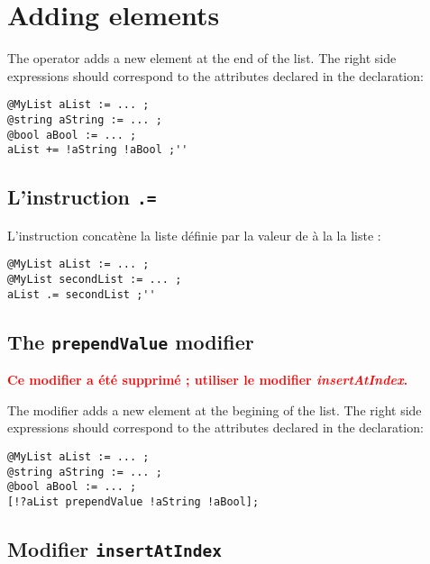 \section{Adding elements}


The  \galgas{+=} operator adds a new element at the end of the list. The right side expressions should correspond to the attributes declared in the  declaration:\\

\begin{lstlisting}[language=galgas]
@MyList aList := ... ;
@string aString := ... ;
@bool aBool := ... ;
aList += !aString !aBool ;''
\end{lstlisting}


\subsection{L'instruction \texttt{.=}}

L'instruction  concatène la liste définie par la valeur de  à la la liste  :

\begin{lstlisting}[language=galgas]
@MyList aList := ... ;
@MyList secondList := ... ;
aList .= secondList ;''
\end{lstlisting}



\subsection{The \texttt{prependValue} modifier}

{\bf \textcolor{red}{Ce modifier a été supprimé ; utiliser le modifier \emph{insertAtIndex}.}}

The  modifier adds a new element at the begining of the list. The right side expressions should correspond to the attributes declared in the   declaration:

\begin{lstlisting}[language=galgas]
@MyList aList := ... ;
@string aString := ... ;
@bool aBool := ... ;
[!?aList prependValue !aString !aBool];
\end{lstlisting}




\subsection{Modifier \texttt{insertAtIndex}}


